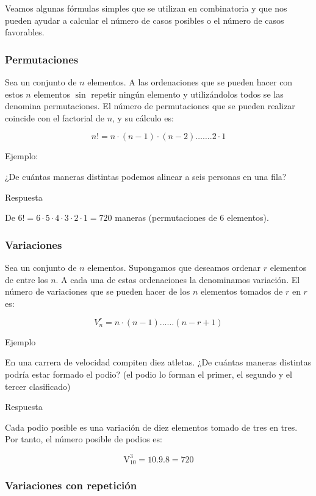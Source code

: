 \documentclass[
]{article}
\begin{document}
Veamos algunas fórmulas simples que se utilizan en combinatoria y que
nos pueden ayudar a calcular el número de casos posibles o el número de
casos favorables.

\subsubsection{Permutaciones}\label{permutaciones}

Sea un conjunto de \(n\) elementos. A las ordenaciones que se pueden hacer
con estos \(n\) elementos \(\sin\) repetir ningún elemento y utilizándolos
todos se las denomina permutaciones. El número de permutaciones que se
pueden realizar coincide con el factorial de \(n\), y su cálculo es:

\[
n!=n \cdot(n-1) \cdot(n-2) \ldots \ldots .2 \cdot 1
\]

Ejemplo:

¿De cuántas maneras distintas podemos alinear a seis personas
en una fila?

Respuesta

De \(6!=6 \cdot 5 \cdot 4 \cdot 3 \cdot 2 \cdot 1=720\) maneras
(permutaciones de 6 elementos).

\subsubsection{Variaciones}\label{variaciones}

Sea un conjunto de \(n\) elementos. Supongamos que deseamos ordenar \(r\)
elementos de entre los \(n\). A cada una de estas ordenaciones la
denominamos variación. El número de variaciones que se pueden hacer de
los \(n\) elementos tomados de \(r\) en \(r\) es:

\[
V_{n}^{r}=n \cdot(n-1) \ldots \ldots(n-r+1)
\]

Ejemplo

En una carrera de velocidad compiten diez atletas. ¿De cuántas maneras
distintas podría estar formado el podio? (el podio lo forman el primer,
el segundo y el tercer clasificado)

Respuesta

Cada podio posible es una variación de diez elementos tomado de tres en
tres. Por tanto, el número posible de podios es:

\[
\mathrm{V}_{10}^{3}=10.9 .8=720
\]

\subsubsection{Variaciones con repetición}\label{variaciones-con-repeticiuxf3n}
\end{document}
